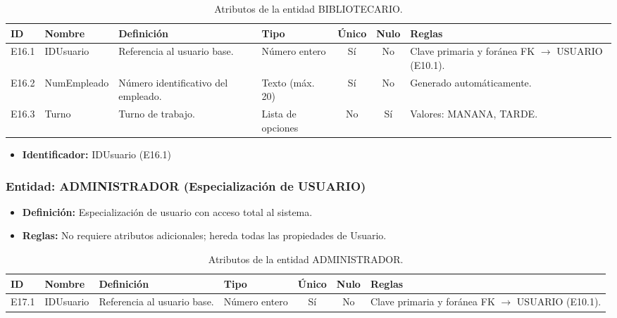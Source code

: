 	\begin{table}[H]
		\centering
		\caption{Atributos de la entidad BIBLIOTECARIO.}
		\label{tab:dict_bibliotecario}
		\small
		\begin{tabularx}{\textwidth}{l l X l c c X}
			\toprule
			\textbf{ID} & \textbf{Nombre} & \textbf{Definición} & \textbf{Tipo} & \textbf{Único} & \textbf{Nulo} & \textbf{Reglas} \\
			\midrule
			E16.1 & IDUsuario & Referencia al usuario base. & Número entero & Sí & No & Clave primaria y foránea FK $\rightarrow$ USUARIO (E10.1). \\
			\addlinespace
			E16.2 & NumEmpleado & Número identificativo del empleado. & Texto (máx. 20) & Sí & No & Generado automáticamente. \\
			\addlinespace
			E16.3 & Turno & Turno de trabajo. & Lista de opciones & No & Sí & Valores: MANANA, TARDE. \\
			\bottomrule
		\end{tabularx}
	\end{table}
	
	\begin{itemize}
		\item\textbf{Identificador:} IDUsuario (E16.1)
	\end{itemize}
	
	\subsubsection{Entidad: ADMINISTRADOR (Especialización de USUARIO)}
	\begin{itemize}
		\item\textbf{Definición:} Especialización de usuario con acceso total al sistema.
		\item\textbf{Reglas:} No requiere atributos adicionales; hereda todas las propiedades de Usuario.
	\end{itemize}
	
	\begin{table}[H]
		\centering
		\caption{Atributos de la entidad ADMINISTRADOR.}
		\label{tab:dict_administrador}
		\small
		\begin{tabularx}{\textwidth}{l l X l c c X}
			\toprule
			\textbf{ID} & \textbf{Nombre} & \textbf{Definición} & \textbf{Tipo} & \textbf{Único} & \textbf{Nulo} & \textbf{Reglas} \\
			\midrule
			E17.1 & IDUsuario & Referencia al usuario base. & Número entero & Sí & No & Clave primaria y foránea FK $\rightarrow$ USUARIO (E10.1). \\
			\bottomrule
		\end{tabularx}
	\end{table}
	

